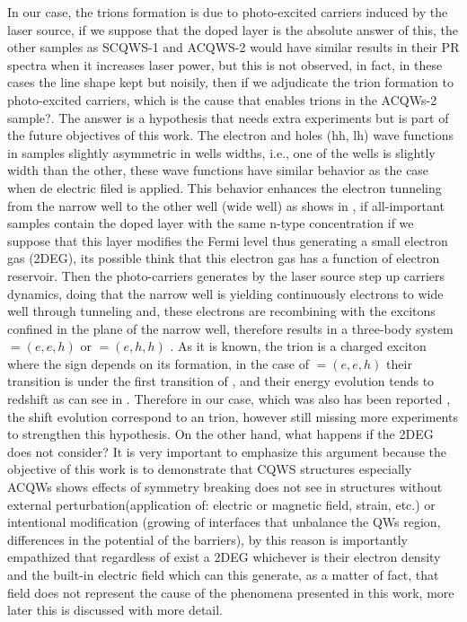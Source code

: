 In our case, the trions formation is due to photo-excited carriers induced by the laser source, if we suppose that the doped layer is the absolute answer of this, the other samples as SCQWS-1 and ACQWS-2 would have similar results in their PR spectra when it increases laser power, but this is not observed, in fact, in these cases the line shape kept but noisily, then if we adjudicate the trion formation to photo-excited carriers, which is the cause that enables trions in the ACQWs-2 sample?. The answer is a hypothesis that needs extra experiments but is part of the future objectives of this work. The electron and holes (hh, lh) wave functions in samples slightly asymmetric in wells widths, i.e., one of the wells is slightly width than the other, these wave functions have similar behavior as the case when de electric filed is applied. This behavior enhances the electron tunneling from the narrow well to the other well (wide well) as shows in , if all-important samples contain the doped layer with the same n-type concentration if we suppose that this layer modifies the Fermi level thus generating a small electron gas (2DEG), its possible think that this electron gas has a function of electron reservoir\cite{manassen1996exciton,finkelstein1996negatively}.  Then the photo-carriers generates by the laser source step up carriers dynamics, doing that the narrow well is yielding continuously electrons to wide well through tunneling and, these electrons are recombining with the excitons confined in the plane of the narrow well, therefore results in a three-body system  \xm$=(e,e,h)$ or  \xp$=(e,h,h)$ . As it is known, the trion is a charged exciton where the sign depends on its formation, in the case of \xm$=(e,e,h)$  their transition is under the first transition of \xhh, and their energy evolution tends to redshift as can see in . Therefore in our case, which was also has been reported 
\cite{sibeldin2001formation,israel2005trions,manassen1996exciton,kheng1993observation,finkelstein1996negatively}, the shift evolution correspond to an \xm trion, however still missing more experiments to strengthen this hypothesis. On the other hand, what happens if the 2DEG does not consider? 
It is very important to emphasize this argument because the objective of this work is to demonstrate that CQWS structures especially ACQWs shows effects of symmetry breaking does not see in structures without external perturbation(application of:  electric or magnetic field,  strain, etc.) or intentional modification (growing of interfaces that unbalance the QWs region, differences in the potential of the barriers), by this reason is importantly empathized that regardless of exist a 2DEG whichever is their electron density and the built-in electric field which can this generate, as a matter of fact,  that field does not represent the cause of the phenomena presented in this work, more later this is discussed with more detail. 
